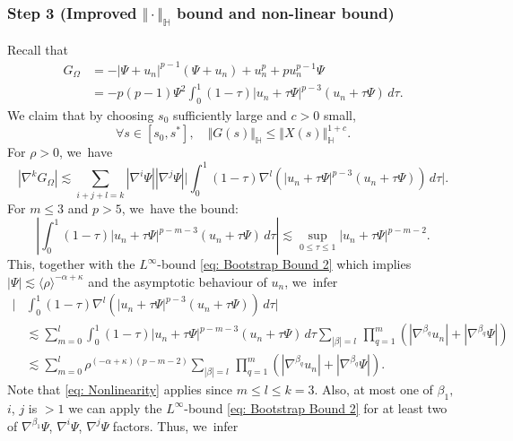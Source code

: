 \documentclass[10pt]{amsart}
\theoremstyle{plain}
\theoremstyle{definition}
\begin{document}
\subsubsection*{Step 3 (Improved $\Vert \cdot\Vert_{\mathbb H}$ bound and non-linear bound)}
Recall that
\begin{equation}
\label{eq: Integral Form of Nonlinearity}
\begin{aligned}
G_\Omega&=-|\Psi+u_n|^{p-1}(\Psi+u_n)+u_n^p+pu_n^{p-1}\Psi\\
&=-p(p-1)\Psi^2\int_0^1(1-\tau)|u_n+\tau\Psi|^{p-3}(u_n+\tau\Psi)\,d\tau.
\end{aligned}
\end{equation}
We claim that by choosing $s_0$ sufficiently large and $c>0$ small,
\begin{equation}
\label{eq: Nonlinear Bound 2}
\forall s\in [s_0,s^*],\quad \Vert G(s)\Vert_{\mathbb H}\le\Vert X(s)\Vert_{\mathbb H}^{1+c}.
\end{equation}
For $\rho>0$, we~have
\begin{equation}
\label{eq: Derivative Nonlinearity}
|\nabla^k G_\Omega|\lesssim \sum_{i+j+l=k}|\nabla^i\Psi||\nabla^j\Psi| \bigg|\int_0^1(1-\tau)\nabla^l\left(|u_n+\tau\Psi|^{p-3}(u_n+\tau\Psi)\right)\,d\tau\bigg|.
\end{equation}
For $m\le 3$ and $p>5$, we~have the bound:
\begin{equation}
\label{eq: Nonlinearity}
\left|\int_0^1(1-\tau)|u_n+\tau\Psi|^{p-m-3}(u_n+\tau\Psi)\,d\tau\right|\lesssim \sup_{0\le\tau\le1}|u_n+\tau\Psi|^{p-m-2}.
\end{equation}
This, together with the $L^\infty$-bound \eqref{eq: Bootstrap Bound 2} which implies $|\Psi|\lesssim \langle\rho\rangle^{-\alpha+\kappa}$ and the asymptotic behaviour of $u_n$, we~infer
\begin{equation}
\label{eq: Nonlinearity Expansion}
\begin{aligned}
\bigg|&\int_0^1(1-\tau)\nabla^l\left(|u_n+\tau\Psi|^{p-3}(u_n+\tau\Psi)\right)\,d\tau\bigg|\\
&\lesssim \sum_{m=0}^l\int_0^1(1-\tau)|u_n+\tau\Psi|^{p-m-3}(u_n+\tau\Psi)\,d\tau\sum_{|\beta|=l}\,\prod_{q=1}^m(|\nabla^{\beta_q}u_n|+|\nabla^{\beta_q}\Psi|)\\
&\lesssim \sum_{m=0}^l\rho^{(-\alpha+\kappa)(p-m-2)}\sum_{|\beta|=l}\,\prod_{q=1}^m(|\nabla^{\beta_q}u_n|+|\nabla^{\beta_q}\Psi|).
\end{aligned}
\end{equation}
Note that \eqref{eq: Nonlinearity} applies since $m\le l\le k=3$. Also, at most one of $\beta_1,$ $i$, $j$ is $>1$ \ie we can apply the $L^\infty$-bound \eqref{eq: Bootstrap Bound 2} for at least two of $\nabla^{\beta_1}\Psi$, $\nabla^i\Psi$, $\nabla^j\Psi$ factors. Thus, we~infer
\end{document}
